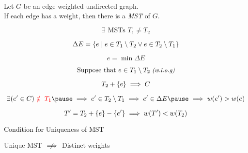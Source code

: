 
\begin{frame}{}
  \begin{theorem}
    Let $G$ be an edge-weighted undirected graph. \\
    If each edge has a  weight,
    then there is a  {\it MST} of $G$.
  \end{theorem}

  \pause
  \vspace{0.50cm}
  \centerline{}

  \pause
  \[
    \exists \text{ MSTs } T_1 \neq T_2
  \]

  \pause
  \[
    \Delta E = \{e \mid e \in T_1 \setminus T_2 \lor e \in T_2 \setminus T_1\}
  \]

  \pause
  \[
    e = \min \Delta E
  \]

  \pause
  \[
    \text{Suppose that } e \in T_1 \setminus T_2 \;\text{\small \it (w.l.o.g)}
  \]
\end{frame}

\begin{frame}{}

  \pause
  \vspace{-0.30cm}
  \[
    T_2 + \{e\} \implies C
  \]

  \pause
  \vspace{-0.30cm}
  \[
    \exists (e' \in C) \red{\;\notin\; T_1} \pause \implies e' \in T_{2} \setminus T_{1} \implies e' \in \Delta E \pause \implies w(e') > w(e)
  \]

  \pause
  \vspace{-0.50cm}
  \[
    T' = T_{2} + \{e\} - \{e'\} \implies w(T') < w(T_{2})
  \]
\end{frame}

\begin{frame}{}
  \begin{exampleblock}{Condition for Uniqueness of MST}
    \centerline{Unique MST $\centernot\implies$ Distinct weights}
  \end{exampleblock}

  \pause
\end{frame}
